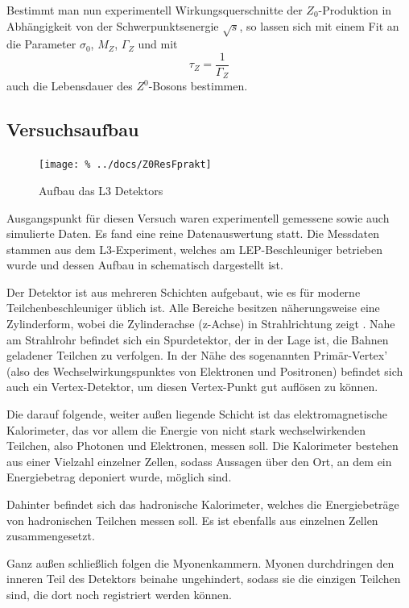 Bestimmt man nun experimentell Wirkungsquerschnitte der $Z_0$-Produktion in
Abhängigkeit von der Schwerpunktsenergie $\sqrt{s}$, so lassen sich mit einem
Fit an  die Parameter $\sigma_0$, $M_Z$, $\Gamma_Z$ und mit
\begin{equation}
  \tau_Z = \frac{1}{\Gamma_Z}
\end{equation}
auch die Lebensdauer des $Z^0$-Bosons bestimmen.


\subsection{Versuchsaufbau}

\begin{figure}[htb]
 \centering
 \texttt{[image: \%
  ../docs/Z0ResFprakt]}
 \caption{Aufbau das L3 Detektors}
 \label{fig:aufbau_detektor}
\end{figure}

Ausgangspunkt für diesen Versuch waren experimentell gemessene sowie auch
simulierte Daten. Es fand eine reine Datenauswertung statt.
Die Messdaten stammen aus dem L3-Experiment, welches am LEP-Beschleuniger betrieben wurde und dessen Aufbau in
 schematisch dargestellt ist.

Der Detektor ist aus mehreren Schichten aufgebaut,
wie es für moderne Teilchenbeschleuniger üblich ist. Alle Bereiche besitzen näherungsweise eine Zylinderform, wobei die Zylinderachse (z-Achse) in Strahlrichtung zeigt . Nahe am Strahlrohr befindet sich ein Spurdetektor, der in der Lage ist, die Bahnen geladener Teilchen zu verfolgen. In der Nähe des sogenannten Primär-Vertex’ (also des Wechselwirkungspunktes von Elektronen und Positronen) befindet sich auch ein Vertex-Detektor, um diesen Vertex-Punkt gut auflösen zu können.

Die darauf folgende, weiter außen liegende Schicht ist das elektromagnetische Kalorimeter, das vor allem die Energie von nicht stark wechselwirkenden Teilchen, also Photonen und Elektronen, messen soll. Die Kalorimeter bestehen aus einer Vielzahl einzelner Zellen, sodass Aussagen über den Ort, an dem ein Energiebetrag deponiert wurde, möglich sind.

Dahinter befindet sich das hadronische Kalorimeter, welches die Energiebeträge von hadronischen Teilchen messen soll. Es ist ebenfalls aus einzelnen Zellen zusammengesetzt.

Ganz außen schließlich folgen die Myonenkammern. Myonen durchdringen den inneren Teil des Detektors beinahe ungehindert, sodass sie die einzigen Teilchen sind, die dort noch registriert werden können.

